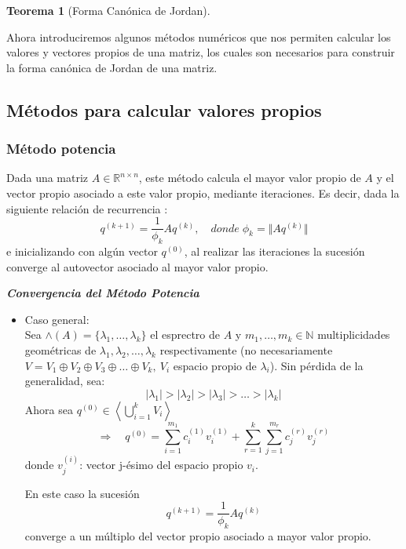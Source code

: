 \documentclass[12pt,a4paper]{article}
\newtheorem{mytheo}{Teorema}[section]
\begin{document}
\begin{multicols}{2}
\begin{mytheo}[Forma Canónica de Jordan]
\begin{enumerate}
			
		\end{enumerate}
	\end{mytheo}
	\noindent Ahora introduciremos algunos métodos numéricos que nos permiten calcular los valores y vectores  propios de una matriz, los cuales son necesarios para construir la forma canónica de Jordan de una matriz.
	\subsection{Métodos para calcular valores propios}
	\subsubsection{Método potencia}
	\noindent Dada una matriz $A\in \mathbb{R}^{n\times n}$, este método calcula el mayor valor propio de $A$ y el vector propio asociado a este valor propio, mediante iteraciones.
	Es decir, dada la siguiente relación de recurrencia :\begin{equation*}
	q^{(k+1)} = \frac{1}{\phi_{k}}Aq^{(k)},\quad donde\;\phi_{k} = \Vert Aq^{(k)}\Vert    
	\end{equation*} e inicializando con algún vector $q^{(0)}$, al realizar las iteraciones la sucesión converge al autovector asociado al mayor valor propio.
	
	\noindent\textit{\textbf{Convergencia del Método Potencia}}
	\begin{itemize}
		\item Caso general:\\
		Sea $\wedge(A)=\{\lambda_{1},\ldots,\lambda_{k}\}$ el esprectro de $A$ y $m_{1}, \ldots , m_{k}\in\mathbb{N}$ multiplicidades geométricas de $\lambda_{1},\lambda_{2},\ldots ,\lambda_{k}$ respectivamente (no necesariamente\\ $V=V_{1}\oplus V_{2}\oplus V_{3}\oplus\ldots\oplus V_{k},\ V_{i}$ espacio propio de $\lambda_{i}$).
		Sin pérdida de la generalidad, sea:
		$$\vert\lambda_{1}\vert > \vert\lambda_{2}\vert > \vert\lambda_{3}\vert > \ldots>\vert\lambda_{k}\vert$$
		Ahora sea $q^{(0)}\in\left<\bigcup_{i=1}^{k}V_{i}\right>$
		$$\Rightarrow\quad q^{(0)} = \sum_{i=1}^{m_{1}}c_{i}^{(1)}v_{i}^{(1)} + \sum_{r=1}^{k}\sum_{j=1}^{m_{r}}c_{j}^{(r)}v_{j}^{(r)}$$
		donde $v_{j}^{(i)}$: vector j-ésimo del espacio propio $v_{i}$.
		
		
		
		En este caso la sucesión $$q^{(k+1)}=\frac{1}{\phi_{k}}Aq^{(k)}$$ converge a un múltiplo del vector propio asociado a mayor valor propio.\\
	\end{itemize}
	

\end{multicols}
\end{document}
